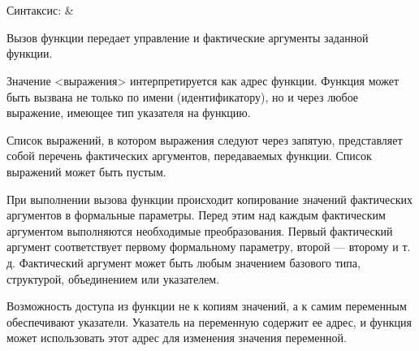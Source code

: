 \section{}

\begin{pHeader}
Синтаксис:      & \\                   
\end{pHeader}

Вызов функции передает управление и фактические аргументы заданной функции.


Значение <выражения> интерпретируется как адрес функции. Функция может быть вызвана не только по имени (идентификатору), но и через любое выражение, имеющее тип указателя на функцию.


Список выражений, в котором выражения следуют через запятую, представляет собой перечень фактических аргументов, передаваемых функции. Список выражений может быть пустым.

При выполнении вызова функции происходит копирование значений фактических аргументов в формальные параметры.  Перед этим над каждым фактическим аргументом выполняются необходимые преобразования. Первый фактический аргумент соответствует первому формальному параметру, второй — второму и т. д. Фактический аргумент может быть любым значением базового типа, структурой, объединением или указателем. 
 
Возможность доступа из функции не к копиям значений, а к самим переменным обеспечивают указатели. Указатель на переменную содержит ее адрес, и функция может использовать этот адрес для изменения значения переменной. \killoverfullbefore \BL
 
